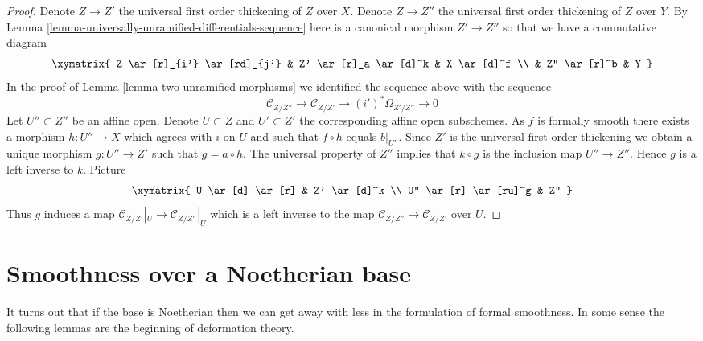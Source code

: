 \begin{proof}
Denote $Z \to Z'$ the universal first order thickening of $Z$ over $X$.
Denote $Z \to Z''$ the universal first order thickening of $Z$ over $Y$.
By
Lemma \ref{lemma-universally-unramified-differentials-sequence}
here is a canonical morphism $Z' \to Z''$ so that we have a commutative
diagram
$$
\xymatrix{
Z \ar[r]_{i'} \ar[rd]_{j'} & Z' \ar[r]_a \ar[d]^k & X \ar[d]^f \\
& Z'' \ar[r]^b & Y
}
$$
In the proof of
Lemma \ref{lemma-two-unramified-morphisms}
we identified the sequence above with the sequence
$$
\mathcal{C}_{Z/Z''} \to
\mathcal{C}_{Z/Z'} \to
(i')^*\Omega_{Z'/Z''} \to 0
$$
Let $U'' \subset Z''$ be an affine open. Denote $U \subset Z$ and
$U' \subset Z'$ the corresponding affine open subschemes.
As $f$ is formally smooth there exists a morphism $h : U'' \to X$
which agrees with $i$ on $U$ and such that $f \circ h$ equals $b|_{U''}$.
Since $Z'$ is the universal first order thickening we obtain a unique
morphism $g : U'' \to Z'$ such that $g = a \circ h$. The universal
property of $Z''$ implies that $k \circ g$ is the inclusion map
$U'' \to Z''$. Hence $g$ is a left inverse to $k$. Picture
$$
\xymatrix{
U \ar[d] \ar[r] & Z' \ar[d]^k \\
U'' \ar[r] \ar[ru]^g & Z''
}
$$
Thus $g$ induces a map $\mathcal{C}_{Z/Z'}|_U \to \mathcal{C}_{Z/Z''}|_U$
which is a left inverse to the map
$\mathcal{C}_{Z/Z''} \to \mathcal{C}_{Z/Z'}$ over $U$.
\end{proof}



































\section{Smoothness over a Noetherian base}
\label{section-smooth-Noetherian}

\noindent
It turns out that if the base is Noetherian then we can get away with
less in the formulation of formal smoothness. In some sense the following
lemmas are the beginning of deformation theory.

